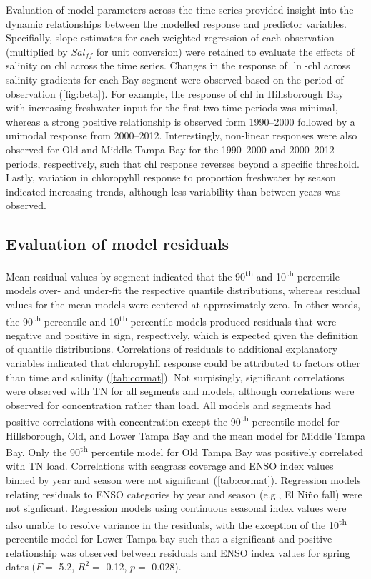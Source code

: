 \documentclass[letterpaper,12pt,oneside]{article}\usepackage{graphicx, color}
\newcommand{\nine}{90\textsuperscript{th} percentile }
\newcommand{\ten}{10\textsuperscript{th} percentile }
\begin{document}
Evaluation of model parameters across the time series provided insight into the dynamic relationships between the modelled response and predictor variables. Specifially, slope estimates for each weighted regression of each observation (multiplied by $Sal_{ff}$ for unit conversion) were retained to evaluate the effects of salinity on \ac{chl} across the time series.  Changes in the response of $\ln$-\ac{chl} across salinity gradients for each Bay segment were observed based on the period of observation (\cref{fig:beta}).  For example, the response of \ac{chl} in Hillsborough Bay with increasing freshwater input for the first two time periods was minimal, whereas a strong positive relationship is observed form 1990--2000 followed by a unimodal response from 2000--2012.  Interestingly, non-linear responses were also observed for Old and Middle Tampa Bay for the 1990--2000 and 2000--2012 periods, respectively, such that \ac{chl} response reverses beyond a specific threshold.  Lastly, variation in chloropyhll response to proportion freshwater by season indicated increasing trends, although less variability than between years was observed.

\subsection{Evaluation of model residuals}

Mean residual values by segment indicated that the 90\textsuperscript{th} and \ten models over- and under-fit the respective quantile distributions, whereas residual values for the mean models were centered at approximately zero.  In other words, the \nine and \ten models produced residuals that were negative and positive in sign, respectively, which is expected given the definition of quantile distributions.  Correlations of residuals to additional explanatory variables indicated that chloropyhll response could be attributed to factors other than time and salinity (\cref{tab:cormat}). Not surpisingly, significant correlations were observed with \ac{TN} for all segments and models, although correlations were observed for concentration rather than load.  All models and segments had positive correlations with concentration except the \nine model for Hillsborough, Old, and Lower Tampa Bay and the mean model for Middle Tampa Bay.  Only the \nine model for Old Tampa Bay was positively correlated with \ac{TN} load.  Correlations with seagrass coverage and \ac{ENSO} index values binned by year and season were not significant (\cref{tab:cormat}).  Regression models relating residuals to \ac{ENSO} categories by year and season (e.g., El Ni\~{n}o fall) were not signficant.  Regression models using continuous seasonal index values were also unable to resolve variance in the residuals, with the exception of the \ten model for Lower Tampa bay such that a significant and positive relationship was observed between residuals and \ac{ENSO} index values for spring dates ($F=$ 5.2, $R^2 =$ 0.12, $p=$ 0.028).  
\end{document}
